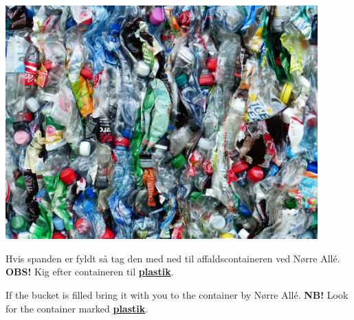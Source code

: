 \documentclass{article}
\begin{document}
\maketitle

\null

\begin{minipage}[l]{.5\textwidth}
  \includegraphics[width=12cm]{../billeder/plastik.jpg}
\end{minipage}
\begin{minipage}[c]{.5\textwidth}
\vspace{-0.7cm}

\Large Hvis spanden er fyldt så tag den med ned til affaldscontaineren ved Nørre
Allé.\\
\textbf{OBS!} Kig efter containeren til \underline{\textbf{plastik}}.

\english
{}
\vspace{-0.5cm}

\Large If the bucket is filled bring it with you to the container by Nørre Allé.
\textbf{NB!} Look for the container marked \underline{\textbf{plastik}}.
\end{minipage}

\dansk
\underskriv
\end{document}
